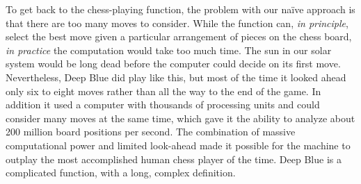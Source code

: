 To get back to the chess-playing function, the problem with our
na\"ive approach is that there are too many moves to consider.
While the function can, \emph{in principle},
select the best move given a particular arrangement of pieces on the chess board,
\emph{in practice} the computation
would take too much time.
The sun in our solar system would be long dead
before the computer could decide on its first move.
Nevertheless, Deep Blue
did play like this, but most of the time it looked ahead
only six to eight moves rather than
all the way to the end of the game.
In addition it used a computer with thousands of processing units
and could consider many moves at the same time, which gave it
the ability to analyze about 200 million board positions per second.
The combination of massive computational power and limited look-ahead
made it possible for the machine to outplay the most accomplished human chess player of the time.
Deep Blue is a complicated function, with a long, complex definition.

